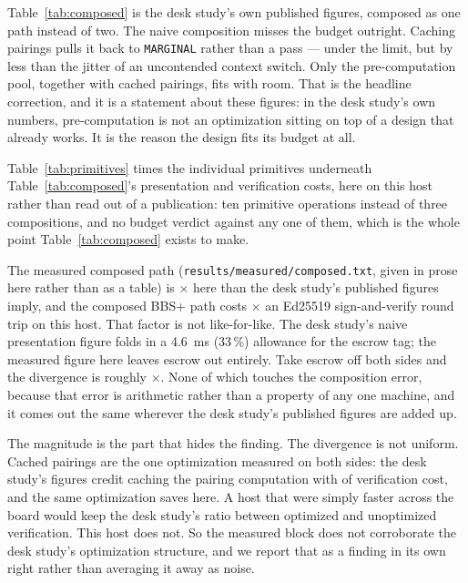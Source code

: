 \documentclass[11pt]{article}
\begin{document}


Table~\ref{tab:composed} is the desk study's own published figures, composed
as one path instead of two. The naive composition misses the budget outright.
Caching pairings pulls it back to \texttt{MARGINAL} rather than a pass ---
under the limit, but by less than the jitter of an uncontended context
switch. Only the pre-computation pool, together with cached pairings, fits
with room. That is the headline correction, and it is a statement about these
figures: in the desk study's own numbers, pre-computation is not an
optimization sitting on top of a design that already works. It is the reason
the design fits its budget at all.

Table~\ref{tab:primitives} times the individual primitives underneath
Table~\ref{tab:composed}'s presentation and verification costs, here on this
host rather than read out of a publication: ten primitive operations instead
of three compositions, and no budget verdict against any one of them, which
is the whole point Table~\ref{tab:composed} exists to make.



The measured composed path (\texttt{results/measured/composed.txt}, given in
prose here rather than as a table) is \measureddivergencefactor{}$\times$
\measureddivergencedirection{} here than the desk study's published figures
imply, and the composed BBS+ path costs \measuredratiotobaseline{}$\times$ an
Ed25519 sign-and-verify round trip on this host. That factor is not
like-for-like. The desk study's naive presentation figure folds in a
\SI{4.6}{\milli\second} (33\,\%) allowance for the escrow tag; the measured
figure here leaves escrow out entirely. Take escrow off both sides and the
divergence is roughly \measureddivergencefactorexclescrow{}$\times$. None of
which touches the composition error, because that error is arithmetic rather
than a property of any one machine, and it comes out the same wherever the
desk study's published figures are added up.

The magnitude is the part that hides the finding. The divergence is not
uniform. Cached pairings are the one optimization measured on both sides:
the desk study's figures credit caching the pairing computation with
\deskcachedsavingpct{} of verification cost, and the same optimization saves
\measuredcachedsavingpct{} here. A host that were simply faster across the
board would keep the desk study's ratio between optimized and unoptimized
verification. This host does not. So the measured block does not corroborate
the desk study's optimization structure, and we report that as a finding in
its own right rather than averaging it away as noise.
\end{document}
